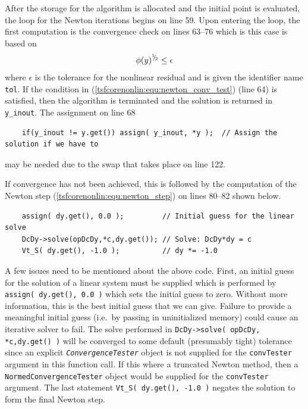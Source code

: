 After the storage for the algorithm is allocated and the initial point
is evaluated, the loop for the Newton iterations begins on line 59.
Upon entering the loop, the first computation is the convergence check
on lines 63--76 which is this case is based on
%
\begin{equation}
\phi(y)^{{}^1 \!\! / \! {}_2} \le \epsilon
\label{tsfcorenonlin:equ:newton_conv_test}
\end{equation}
%
where $\epsilon$ is the tolerance for the nonlinear residual and is
given the identifier name \texttt{tol}.  If the condition in
(\ref{tsfcorenonlin:equ:newton_conv_test}) (line 64) is satisfied,
then the algorithm is terminated and the solution is returned in
\texttt{y\_inout}.  The assignment on line 68
%
{\scriptsize\begin{verbatim}
    if(y_inout != y.get()) assign( y_inout, *y );  // Assign the solution if we have to
\end{verbatim}}
%
\noindent{}may be needed due to the swap that takes place on line 122.

If convergence has not been achieved, this is followed by the
computation of the Newton step (\ref{tsfcorenonlin:equ:newton_step})
on lines 80--82 shown below.
%
{\scriptsize\begin{verbatim}
    assign( dy.get(), 0.0 );         // Initial guess for the linear solve
    DcDy->solve(opDcDy,*c,dy.get()); // Solve: DcDy*dy = c
    Vt_S( dy.get(), -1.0 );          // dy *= -1.0
\end{verbatim}}
%
A few issues need to be mentioned about the above code.  First, an
initial guess for the solution of a linear system must be supplied
which is performed by \texttt{assign( dy.get(), 0.0 )} which sets the
initial guess to zero.  Without more information, this is the best
initial guess that we can give.  Failure to provide a meaningful
initial guess (i.e.~by passing in uninitialized memory) could cause an
iterative solver to fail.  The solve performed in
\texttt{DcDy->solve( opDcDy, *c,dy.get() )} will be converged to some
default (presumably tight) tolerance since an explicit
\texttt{\textit{Convergence\-Tester}} object is not supplied for
the \texttt{convTester} argument in this function call.  If this where
a truncated Newton method, then a \texttt{Normed\-Convergence\-Tester}
object would be supplied for the \texttt{convTester} argument.  The
last statement \texttt{Vt\_S( dy.get(), -1.0 )} negates the solution
to form the final Newton step.

